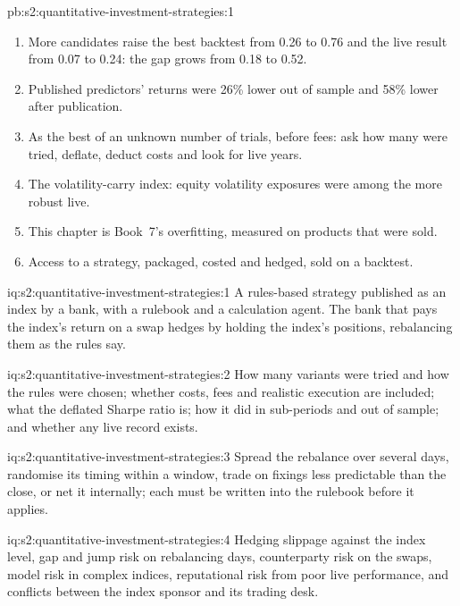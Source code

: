 \begin{solution}{pb:s2:quantitative-investment-strategies:1}
\begin{enumerate}
\item More candidates raise the best backtest from 0.26 to 0.76 and the live result from 0.07 to 0.24: the gap grows from 0.18 to 0.52.
\item Published predictors' returns were 26\% lower out of sample and 58\% lower after publication.
\item As the best of an unknown number of trials, before fees: ask how many were tried, deflate, deduct costs and look for live years.
\item The volatility-carry index: equity volatility exposures were among the more robust live.
\item This chapter is Book~7's overfitting, measured on products that were sold.
\item Access to a strategy, packaged, costed and hedged, sold on a backtest.
\end{enumerate}
\end{solution}

\begin{solution}{iq:s2:quantitative-investment-strategies:1}
A rules-based strategy published as an index by a bank, with a rulebook and a calculation agent. The bank that pays the index's return on a swap hedges
by holding the index's positions, rebalancing them as the rules say.
\end{solution}

\begin{solution}{iq:s2:quantitative-investment-strategies:2}
How many variants were tried and how the rules were chosen; whether costs, fees and realistic execution are included; what the deflated Sharpe
ratio is; how it did in sub-periods and out of sample; and whether any live record exists.
\end{solution}

\begin{solution}{iq:s2:quantitative-investment-strategies:3}
Spread the rebalance over several days, randomise its timing within a window, trade on fixings less predictable than the close, or net it
internally; each must be written into the rulebook before it applies.
\end{solution}

\begin{solution}{iq:s2:quantitative-investment-strategies:4}
Hedging slippage against the index level, gap and jump risk on rebalancing days, counterparty risk on the swaps, model risk in complex indices,
reputational risk from poor live performance, and conflicts between the index sponsor and its trading desk.
\end{solution}

